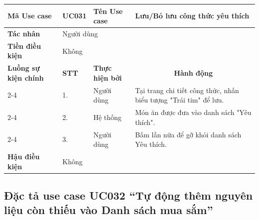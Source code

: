 \documentclass[../main.tex]{subfiles}
\begin{document}
\begin{longtable}{|p{2.7cm}|p{0.8cm}|p{2.6cm}|p{7.3cm}|}
\hline
\cellcolor[HTML]{D5F5E3}\textbf{Mã Use case} & \multicolumn{1}{l|}{UC031} & \cellcolor[HTML]{D5F5E3}\textbf{Tên Use case} & Lưu/Bỏ lưu công thức yêu thích \\ \hline
\cellcolor[HTML]{D5F5E3}\textbf{Tác nhân} & \multicolumn{3}{p{10.7cm}|}{Người dùng} \\ \hline
\cellcolor[HTML]{D5F5E3}\textbf{Tiền điều kiện} & \multicolumn{3}{p{10.7cm}|}{Không} \\ \hline

\cellcolor[HTML]{D5F5E3}\textbf{Luồng sự kiện chính} & \cellcolor[HTML]{FDEBD0}\textbf{STT} & \cellcolor[HTML]{FDEBD0}\textbf{Thực hiện bởi} & \multicolumn{1}{c|}{\cellcolor[HTML]{FDEBD0}\textbf{Hành động}} \\ \cline{2-4} 
\cellcolor[HTML]{D5F5E3} & 1. & Người dùng & Tại trang chi tiết công thức, nhấn biểu tượng "Trái tim" để lưu. \\ \cline{2-4} 
\cellcolor[HTML]{D5F5E3} & 2. & Hệ thống & Món ăn được đưa vào danh sách "Yêu thích". \\ \cline{2-4} 
\cellcolor[HTML]{D5F5E3} & 3. & Người dùng & Bấm lần nữa để gỡ khỏi danh sách Yêu thích. \\ \hline

\cellcolor[HTML]{D5F5E3}\textbf{Hậu điều kiện} & \multicolumn{3}{p{10.7cm}|}{Không} \\ \hline
\end{longtable}
\endgroup

\subsection{Đặc tả use case UC032 ``Tự động thêm nguyên liệu còn thiếu vào Danh sách mua sắm''}
\vspace{0.5cm}

\begingroup
\renewcommand{\arraystretch}{1.5}
\end{document}
